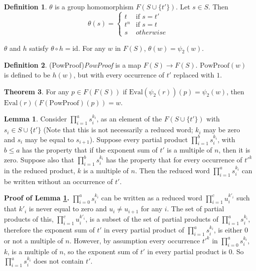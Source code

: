 \documentclass[11pt]{article} %
\theoremstyle{definition}
\newtheorem{theorem}{Theorem}[section]
\theoremstyle{definition}
\theoremstyle{definition}
\theoremstyle{definition}
\newtheorem{sublemma}{Lemma}[theorem]
\theoremstyle{definition}
\newtheorem{defn}[theorem]{Definition}
\theoremstyle{definition}
\begin{document}
\begin{defn}
  $\theta$ is a group homomorphism $F(S \cup \{t'\})$. Let $s \in S$. Then
  \begin{equation}
    \theta(s) = \begin{cases}
      t & \text{if } s = t' \\
      t^n & \text{if } s = t \\
      s & otherwise
    \end{cases}
  \end{equation}
\end{defn}

$\theta$ and $h$ satisfy $\theta \circ h = \text{id}$. For any $w$ in $F(S)$,
$\theta(w) = \psi_2(w)$.

\begin{defn}(PowProof)\label{PowProof}
  \textit{PowProof} is a map $F(S) \to F(S)$. $\text{PowProof}(w)$ is defined to be
  $h(w)$, but with every occurrence of $t'$ replaced with $1$.
\end{defn}

\begin{theorem}\label{powproof}
  For any $p \in F(F(S))$ if \newline $\text{Eval}(\psi_2(r))(p) = \psi_2(w)$,
  then $\text{Eval}(r)(F(\text{PowProof})(p)) = w$.
\end{theorem}

\begin{sublemma}\label{powproof1}
  Consider $\prod_{i = 1}^a s_i^{k_i}$, as an element of the $F(S \cup \{t'\})$
  with $s_i \in S \cup \{t'\}$ (Note that this is not necessarily a reduced
  word; $k_i$ may be zero and $s_i$ may be equal to $s_{i+1}$).
  Suppose every partial product $\prod_{i=1}^b s_i^{k_i}$,
  with $b \le a$ has the property that if the exponent sum of $t'$ is a multiple
  of $n$, then it is zero. Suppose also that $\prod_{i = 1}^b s_i^{k_i}$ has the
  property that for every occurrence of $t'^k$ in the reduced product, $k$ is a multiple of
  $n$. Then the reduced word $\prod_{i = 1}^a s_i^{k_i}$
  can be written without an occurrence of $t'$.
\end{sublemma}

\textbf{Proof of Lemma \ref{powproof1}.} $\prod_{i=0}^a s_i^{k_i}$ can be written as a reduced
word $\prod_{i = 1}^{c} u_i^{k'_i}$ such that $k'_i$ is never equal to zero and
$u_i \ne u_{i+1}$ for any $i$. The set of partial products of this,
$\prod_{i = 1}^{c} u_i^{k'_i}$, is a subset of the set of partial products of
$\prod_{i=1}^a s_i^{k_i}$,
therefore the exponent sum of $t'$ in every partial product of $\prod_{i=1}^a s_i^{k_i}$, is
either $0$ or not a multiple of $n$. However, by assumption every occurrence $t'^k$ in
$\prod_{i=0}^a s_i^{k_i}$, $k$, is a multiple of $n$, so the exponent sum of $t'$ in every
partial product is $0$. So $\prod_{i=1}^a s_i^{k_i}$ does not contain $t'$.
\end{document}
